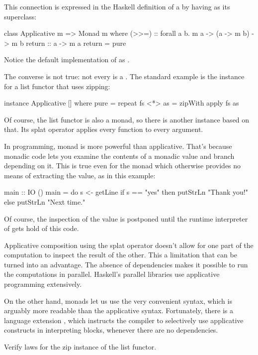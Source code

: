 \documentclass[DaoFP]{subfiles}
\begin{document}
This connection is expressed in the Haskell definition of a  by having  as its superclass:
\begin{haskell}
class Applicative m => Monad m where
    (>>=)       :: forall a b. m a -> (a -> m b) -> m b
    return      :: a -> m a
    return      = pure
\end{haskell}
Notice the default implementation of  as . 

The converse is not true: not every  is a . The standard example is the  instance for a list functor that uses zipping:
\begin{haskell}
instance Applicative [] where
  pure = repeat
  fs <*> as = zipWith apply fs as
\end{haskell}
Of course, the list functor is also a monad, so there is another  instance based on that. Its splat operator applies every function to every argument.

In programming, monad is more powerful than applicative. That's because monadic code lets you examine the contents of a monadic value and branch depending on it. This is true even for the  monad which otherwise provides no means of extracting the value, as in this example:
\begin{haskell}
main :: IO ()
main = do
  s <- getLine
  if s == "yes"
  then putStrLn "Thank you!"
  else putStrLn "Next time."
\end{haskell}
Of course, the inspection of the value is postponed until the runtime interpreter of  gets hold of this code. 

Applicative composition using the splat operator doesn't allow for one part of the computation to inspect the result of the other. This a limitation that can be turned into an advantage. The absence of dependencies makes it possible to run the computations in parallel.  Haskell's parallel libraries use applicative programming extensively.

On the other hand, monads let us use the very convenient  syntax, which is arguably more readable than the applicative syntax. Fortunately, there is a language extension , which instructs the compiler to selectively use applicative constructs in interpreting  blocks, whenever there are no dependencies.

\begin{exercise}
Verify  laws for the zip instance of the list functor.
\end{exercise}
\end{document}
